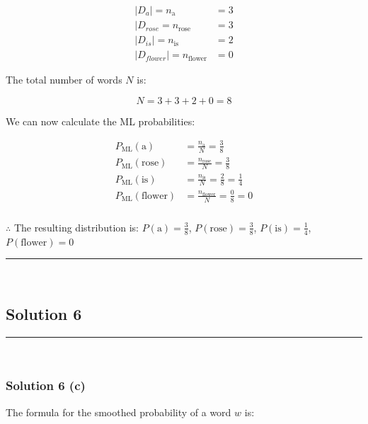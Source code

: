 \documentclass{article}
\begin{document}
\begin{align*}
    |D_{a}| = n_{\mathrm{a}} &= 3 \\
    |D_{rose} = n_{\mathrm{rose}} &= 3\\
    |D_{is}| = n_{\mathrm{is}} &= 2 \\
    |D_{flower}| = n_{\mathrm{flower}} &= 0
\end{align*}
\begin{flushleft}
    The total number of words $N$ is:
\end{flushleft}

$$N = 3 + 3 + 2 + 0 = 8$$
\begin{flushleft}
    We can now calculate the ML probabilities:
\end{flushleft}

\begin{align*}
    P_{\text{ML}}(\mathrm{a}) &= \frac{n_{\mathrm{a}}}{N} = \frac{3}{8} \\
    P_{\text{ML}}(\mathrm{rose}) &= \frac{n_{\mathrm{rose}}}{N} = \frac{3}{8} \\
    P_{\text{ML}}(\mathrm{is}) &= \frac{n_{\mathrm{is}}}{N} = \frac{2}{8} = \frac{1}{4} \\
    P_{\text{ML}}(\mathrm{flower}) &= \frac{n_{\mathrm{flower}}}{N} = \frac{0}{8} = 0
\end{align*}

\subsubsection*{\normalfont}{$\therefore$ The resulting distribution is: $P(\mathrm{a}) = \frac{3}{8}$, $P(\mathrm{rose}) = \frac{3}{8}$, $P(\mathrm{is}) = \frac{1}{4}$, $P(\mathrm{flower}) = 0$} \\

\noindent\rule{\textwidth}{0.4pt}\\

\newpage

\subsection*{Solution 6}
\noindent\rule{\textwidth}{0.4pt}\\
\subsubsection*{Solution 6 (c)}
The formula for the smoothed probability of a word $w$ is:
\end{document}
